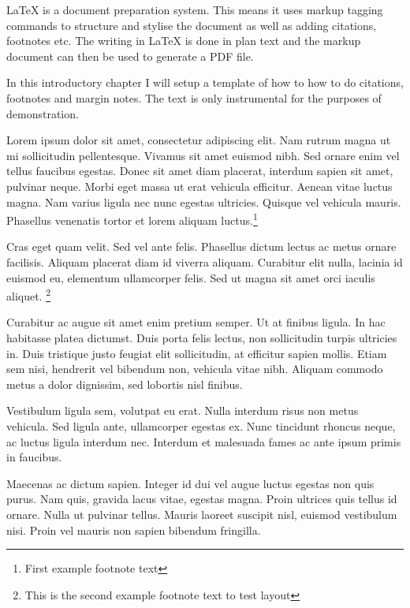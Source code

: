 LaTeX is a document preparation system. This means it uses markup tagging commands to structure and stylise the document as well as adding citations, footnotes etc. The writing in LaTeX is done in plan text and the markup document can then be used to generate a PDF file.

In this introductory chapter I will setup a template of how to how to do citations, footnotes and margin notes. The text is only instrumental for the purposes of demonstration.
\vspace{0.5cm}

Lorem ipsum  \parencite{sennett1998corrosion} dolor sit amet, consectetur adipiscing elit. Nam rutrum magna ut mi sollicitudin pellentesque. Vivamus sit amet euismod nibh. Sed ornare enim vel tellus faucibus egestas. Donec sit amet diam placerat, interdum sapien sit amet, pulvinar neque. Morbi eget massa ut erat vehicula efficitur. Aenean vitae luctus magna. Nam varius ligula nec nunc egestas ultricies. Quisque vel vehicula mauris. Phasellus venenatis tortor et lorem aliquam luctus.\footnote{First example footnote text}

Cras eget quam velit. Sed vel ante felis. Phasellus dictum lectus ac metus ornare facilisis. Aliquam placerat diam id viverra aliquam. Curabitur elit nulla, lacinia id euismod eu, elementum ullamcorper felis. Sed ut magna sit amet orci iaculis aliquet.  \footnote{This is the second example footnote text to test layout}


Curabitur ac augue sit amet enim pretium semper.   Ut at finibus ligula. In hac habitasse platea dictumst. Duis porta felis lectus, non sollicitudin turpis ultricies in. Duis tristique justo feugiat elit sollicitudin, at efficitur sapien mollis. Etiam sem nisi, hendrerit vel bibendum non, vehicula vitae nibh. Aliquam commodo metus a dolor dignissim, sed lobortis nisl finibus. 

Vestibulum ligula sem, volutpat eu erat. Nulla interdum risus non metus vehicula. Sed ligula ante, ullamcorper egestas ex. Nunc tincidunt rhoncus neque, ac luctus ligula interdum nec. Interdum et malesuada fames ac ante ipsum primis in faucibus.\parencite[see][p.10]{mcguigan2014neoliberal}

 Maecenas ac dictum sapien. Integer id dui vel augue luctus egestas non quis purus. Nam quis, gravida lacus vitae, egestas magna. Proin ultrices quis tellus id ornare. Nulla ut pulvinar tellus. Mauris laoreet suscipit nisl, euismod vestibulum nisi. Proin vel mauris non sapien bibendum fringilla. \parencite[see][]{Han2015WhyRevolution}


